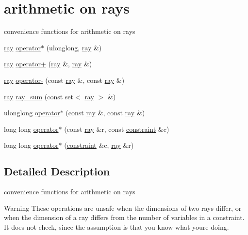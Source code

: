 \hypertarget{group___ray_arithmetic}{}\section{arithmetic on rays}
\label{group___ray_arithmetic}


convenience functions for arithmetic on rays  


\begin{DoxyCompactItemize}
\item 
\hyperlink{classray}{ray} \hyperlink{group___ray_arithmetic_ga2a8508177773923f2c644908b1018952}{operator$\ast$} (ulonglong, \hyperlink{classray}{ray} \&)
\item 
\hyperlink{classray}{ray} \hyperlink{group___ray_arithmetic_gaaa48bb668551858c8d53e230546042ba}{operator+} (\hyperlink{classray}{ray} \&, \hyperlink{classray}{ray} \&)
\item 
\hyperlink{classray}{ray} \hyperlink{group___ray_arithmetic_gafcb092cfc55771c4303f540cb7697a40}{operator-\/} (const \hyperlink{classray}{ray} \&, const \hyperlink{classray}{ray} \&)
\item 
\hyperlink{classray}{ray} \hyperlink{group___ray_arithmetic_gafb95c2b09dc0a5ea693a99cb8340ff28}{ray\+\_\+sum} (const set$<$ \hyperlink{classray}{ray} $>$ \&)
\item 
ulonglong \hyperlink{group___ray_arithmetic_ga46e77b0b8e511950d5df377689e96ec0}{operator$\ast$} (const \hyperlink{classray}{ray} \&, const \hyperlink{classray}{ray} \&)
\item 
long long \hyperlink{group___ray_arithmetic_gafecc0ecbacaa6a8adac584a597cde81e}{operator$\ast$} (const \hyperlink{classray}{ray} \&r, const \hyperlink{classconstraint}{constraint} \&c)
\item 
long long \hyperlink{group___ray_arithmetic_ga1a639563221a01c8626a637cfb3b8d61}{operator$\ast$} (\hyperlink{classconstraint}{constraint} \&c, \hyperlink{classray}{ray} \&r)
\end{DoxyCompactItemize}


\subsection{Detailed Description}
convenience functions for arithmetic on rays 

\begin{DoxyWarning}{Warning}
These operations are unsafe when the dimensions of two rays differ, or when the dimension of a ray differs from the number of variables in a constraint. It does not check, since the assumption is that you know what you\textquotesingle{}re doing. 
\end{DoxyWarning}


